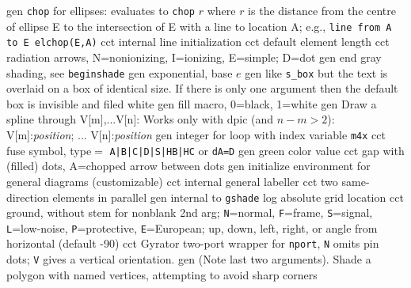   {gen}
  {{\tt chop} for ellipses: evaluates to {\tt chop} $r$ where $r$ is
    the distance from the centre of ellipse E to the intersection of E with
    a line to location A; e.g., {\tt line from A to E elchop(E,A)}}
  {cct}
  {internal line initialization}
  {cct}
  {default element length}
  {cct}
  {radiation arrows, N=nonionizing, I=ionizing, E=simple; D=dot}
  {gen}
  {end gray shading, see {\tt beginshade}}
  {gen}
  {exponential, base $e$}
  {gen}
  {like {\tt s\_box} but the text is overlaid on a box of identical size.
   If there is only one argument then the default box
   is invisible and filed white}
  {gen}
  {fill macro, 0=black, 1=white}
  {gen}
  {Draw a spline through V[m],...V[n]: Works only with dpic (and $n-m>2$):
    V[m]:{\sl position}; ... V[n]:{\sl position}}
  {gen}
  {integer for loop with index variable {\tt m4x}}
  {cct}
  {fuse symbol, type$=$
  {\tt  A|B|C|D|S|HB|HC} or {\tt dA=D}}
  {gen}
  {green color value}
  {cct}
  {gap with (filled) dots, A=chopped arrow between dots}
  {gen}
  {initialize environment for general diagrams (customizable)}
  {cct}
  {internal general labeller}
  {cct}
  {two same-direction elements in parallel}
  {gen}
  {internal to {\tt gshade}}
  {log}
  {absolute grid location}
  {cct}
  { ground, without stem for nonblank 2nd arg;
    {\tt N}=normal, {\tt F}=frame, {\tt S}=signal, {\tt L}=low-noise,
    {\tt P}=protective, {\tt E}=European; up, down, left, right, or angle
    from horizontal (default -90) }
  {cct}
  {Gyrator two-port wrapper for {\tt nport}, {\tt N} omits pin dots; {\tt V}
   gives a vertical orientation.}
  {gen}
  {(Note last two arguments).  Shade a polygon with named
    vertices, attempting to avoid sharp corners}

